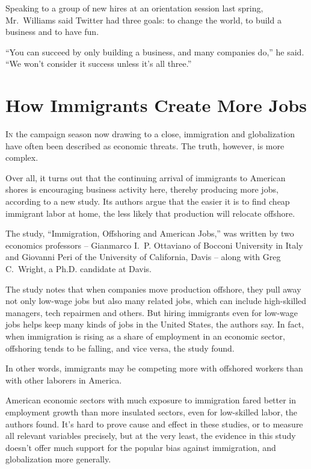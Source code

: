 ﻿\documentclass[12pt]{article}
\begin{document}
Speaking to a group of new hires at an orientation session last spring, Mr.~Williams said Twitter
had three goals: to change the world, to build a business and to have fun.

``You can succeed by only building a business, and many companies do,'' he said. ``We won't consider
it success unless it's all three.''

\section{How Immigrants Create More Jobs}

\lettrine{I}{n} the campaign season now drawing to a close, immigration and
globalization have often been described as economic threats. The truth, however, is more complex.

Over all, it turns out that the continuing arrival of immigrants to American shores is encouraging
business activity here, thereby producing more jobs, according to a new study. Its authors argue
that the easier it is to find cheap immigrant labor at home, the less likely that production will
relocate offshore.

The study, ``Immigration, Offshoring and American Jobs,'' was written by two economics professors --
Gianmarco I.~P. Ottaviano of Bocconi University in Italy and Giovanni Peri of the University of
California, Davis -- along with Greg C.~Wright, a Ph.D. candidate at Davis.

The study notes that when companies move production offshore, they pull away not only low-wage jobs
but also many related jobs, which can include high-skilled managers, tech repairmen and others. But
hiring immigrants even for low-wage jobs helps keep many kinds of jobs in the United States, the
authors say. In fact, when immigration is rising as a share of employment in an economic sector,
offshoring tends to be falling, and vice versa, the study found.

In other words, immigrants may be competing more with offshored workers than with other laborers in
America.

American economic sectors with much exposure to immigration fared better in employment growth than
more insulated sectors, even for low-skilled labor, the authors found. It's hard to prove cause and
effect in these studies, or to measure all relevant variables precisely, but at the very least, the
evidence in this study doesn't offer much support for the popular bias against immigration, and
globalization more generally.
\end{document}
